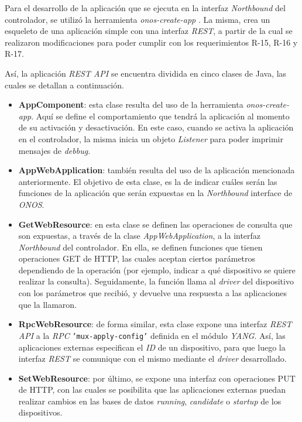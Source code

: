   Para el desarrollo de la aplicación que se ejecuta en la interfaz \textit{Northbound} del controlador, se utilizó la herramienta \textit{onos-create-app} \parencite{onosapptemplate}. La misma, crea un esqueleto de una aplicación simple con una interfaz \textit{REST}, a partir de la cual se realizaron modificaciones para poder cumplir con los requerimientos R-15, R-16 y R-17.

  Así, la aplicación \textit{REST API} se encuentra dividida en cinco clases de Java, las cuales se detallan a continuación. 


  \begin{itemize}
	\item \textbf{AppComponent}: esta clase resulta del uso de la herramienta \textit{onos-create-app}. Aquí se define el comportamiento que tendrá la aplicación al momento de su activación y desactivación. En este caso, cuando se activa la aplicación en el controlador, la misma inicia un objeto \textit{Listener} para poder imprimir mensajes de \textit{debbug}.
    
    \item \textbf{AppWebApplication}: también resulta del uso de la aplicación mencionada anteriormente. El objetivo de esta clase, es la de indicar cuáles serán las funciones de la aplicación que serán expuestas en la \textit{Northbound} interface de \textit{ONOS}.

    \item \textbf{GetWebResource}: en esta clase se definen las operaciones de consulta que son expuestas, a través de la clase \textit{AppWebApplication}, a la interfaz \textit{Northbound} del controlador. En ella, se definen funciones que tienen operaciones GET de HTTP, las cuales aceptan ciertos parámetros dependiendo de la operación (por ejemplo, indicar a qué dispositivo se quiere realizar la consulta). Seguidamente, la función llama al \textit{driver} del dispositivo con los parámetros que recibió,  y devuelve una respuesta a las aplicaciones que la llamaron.
    
    \item \textbf{RpcWebResource}: de forma similar, esta clase expone una interfaz \textit{REST API} a la \textit{RPC} \texttt{'mux-apply-config'} definida en el módulo \textit{YANG}. Así, las aplicaciones externas especifican el \textit{ID} de un dispositivo, para que luego la interfaz \textit{REST} se comunique con el mismo mediante el \textit{driver} desarrollado. 
    
    \item \textbf{SetWebResource}: por último, se expone una interfaz con operaciones PUT de HTTP, con las cuales se posibilita que las aplicaciones externas puedan realizar cambios en las bases de datos \textit{running}, \textit{candidate} o \textit{startup} de los dispositivos.

\end{itemize}

